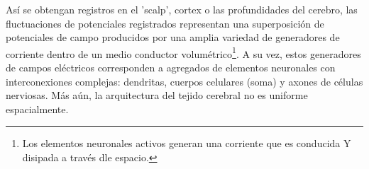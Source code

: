 As\'i se obtengan registros en el 'scalp', cortex o las profundidades del cerebro,
las fluctuaciones de potenciales registrados representan una superposici\'on
de potenciales de campo producidos por una amplia variedad de 
generadores de corriente dentro de un medio conductor volum\'etrico\footnote{Los elementos
neuronales activos generan una corriente que es conducida Y disipada a trav\'es dle espacio.}.
A su vez, estos generadores de campos el\'ectricos corresponden a agregados de elementos
neuronales con interconexiones complejas: dendritas, cuerpos celulares (soma) y axones
de c\'elulas nerviosas. M\'as a\'un, la arquitectura del tejido cerebral no es uniforme
espacialmente.




